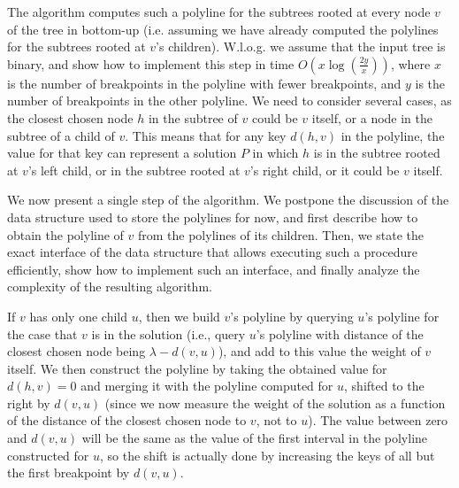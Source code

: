 \documentclass[a4paper,UKenglish]{lipics-v2016}
\theoremstyle{plain}
\begin{document}
The algorithm computes such a polyline for the subtrees rooted at every node $v$ of the tree in bottom-up (i.e. assuming we have already computed the polylines for the subtrees rooted at $v$'s children). W.l.o.g. we assume that the input tree is binary, and show how to
implement this step in time $O(x \log (\frac{2y}{x}))$, where $x$ is the number of breakpoints in the polyline with fewer breakpoints, and $y$ is the number of breakpoints in the other polyline.
We need to consider several cases, as the closest chosen node $h$ in the subtree of $v$ could be $v$ itself, or a node in the subtree of a child of $v$. This means that for any key $d(h,v)$ in the polyline, the value for that key can represent a solution $P$ in which $h$ is in the subtree rooted at $v$'s left child, or in the subtree rooted at $v$'s right child, or it could be $v$ itself.


\vspace{0.04in}  We now present a single step of the algorithm. We postpone the discussion of the data structure used to store the polylines for now, and first describe how to obtain the polyline of $v$ from the polylines of its children. Then, we state the exact interface of the data structure that allows executing such a procedure efficiently, show how to implement such an interface, and finally analyze the complexity of the resulting algorithm.

If $v$ has only one child $u$, then we build $v$'s polyline by querying $u$'s polyline for the case that $v$ is in the solution (i.e., query $u$'s polyline with distance of the closest chosen node being $\lambda-d(v,u)$), and add to this value the weight of $v$ itself. We then construct the polyline by taking the obtained value for $d(h,v)=0$ and merging it with the polyline computed for $u$, shifted to the right by $d(v,u)$ (since we now measure the weight of the solution as a function of the distance of the closest chosen node to $v$, not to $u$). The value between zero and $d(v,u)$ will be the same as the value of the first interval in the polyline constructed for $u$, so the shift is actually done by increasing the keys of all but the first breakpoint by $d(v,u)$.
\end{document}
